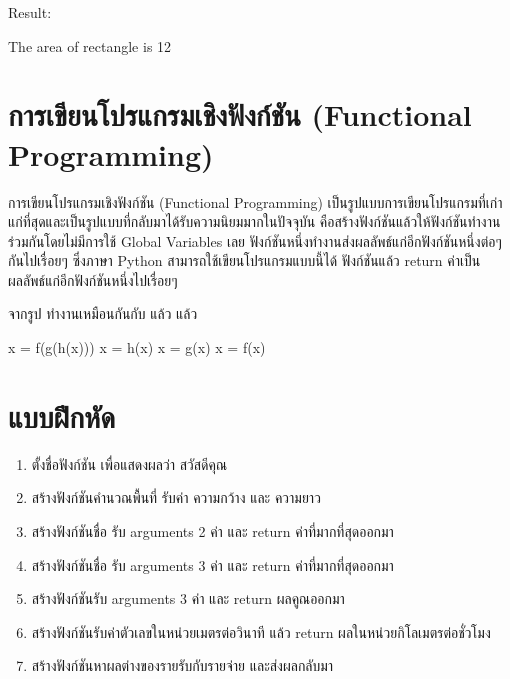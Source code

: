 Result:
\begin{pycode}
The area of rectangle is 12
\end{pycode}


\section{การเขียนโปรแกรมเชิงฟังก์ชัน (Functional Programming)}


การเขียนโปรแกรมเชิงฟังก์ชัน (Functional Programming) เป็นรูปแบบการเขียนโปรแกรมที่เก่าแก่ที่สุดและเป็นรูปแบบที่กลับมาได้รับความนิยมมากในปัจจุบัน คือสร้างฟังก์ชันแล้วให้ฟังก์ชันทำงานร่วมกันโดยไม่มีการใช้ Global Variables เลย ฟังก์ชันหนึ่งทำงานส่งผลลัพธ์แก่อีกฟังก์ชันหนึ่งต่อๆ กันไปเรื่อยๆ ซึ่งภาษา Python สามารถใช้เขียนโปรแกรมแบบนี้ได้ ฟังก์ชันแล้ว return ค่าเป็นผลลัพธ์แก่อีกฟังก์ชันหนึ่งไปเรื่อยๆ  

จากรูป   ทำงานเหมือนกันกับ  แล้ว   แล้ว  

\begin{pycode}
x = f(g(h(x)))
x = h(x)
x = g(x)
x = f(x)
\end{pycode}


\section{แบบฝึกหัด}

\begin{enumerate} 

\item ตั้งชื่อฟังก์ชัน  เพื่อแสดงผลว่า สวัสดีคุณ
\item สร้างฟังก์ชันคำนวณพื้นที่ รับค่า ความกว้าง และ ความยาว
\item สร้างฟังก์ชันชื่อ   รับ arguments 2 ค่า และ return ค่าที่มากที่สุดออกมา
\item สร้างฟังก์ชันชื่อ   รับ arguments 3 ค่า และ return ค่าที่มากที่สุดออกมา
\item สร้างฟังก์ชันรับ arguments 3 ค่า และ return ผลคูณออกมา
\item สร้างฟังก์ชันรับค่าตัวเลขในหน่วยเมตรต่อวินาที แล้ว return ผลในหน่วยกิโลเมตรต่อชั่วโมง
\item สร้างฟังก์ชันหาผลต่างของรายรับกับรายจ่าย และส่งผลกลับมา

\end{enumerate}


